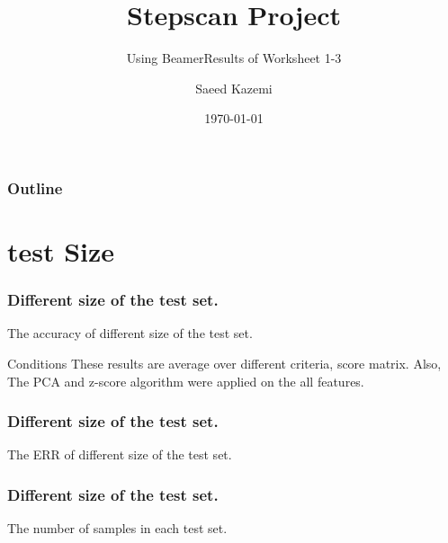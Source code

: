 \documentclass{beamer}
\subtitle{Using Beamer}
\title{ \textbf{Stepscan Project}}
\subtitle{Results of Worksheet 1-3}
\date{\today}
\author{Saeed Kazemi}
\institute{ University of New Brunswick}
\begin{document}
\begin{frame}
\titlepage
\end{frame}


\begin{frame}
\frametitle{Outline}
\tableofcontents
\end{frame}


\section{test Size}

\begin{frame}
\frametitle{Different size of the test set.}
\tiny
\begin{table}
\centering
\captionsetup{labelformat=empty}
\caption{\small The accuracy of different size of the test set.}
\label{tab:parameters condition}

\end{table}
\begin{block}{Conditions}
    These results are average over different criteria, score matrix. Also, The PCA and z-score algorithm were applied on the all features.
\end{block}

\end{frame}
\begin{frame}
\frametitle{Different size of the test set.}
\tiny
\begin{table}
\centering
\captionsetup{labelformat=empty}
\caption{\small The  ERR of different size of the test set.}
\label{tab:parameters condition}

\end{table}
\end{frame}
\begin{frame}
\frametitle{Different size of the test set.}
\tiny
\begin{table}
\centering
\captionsetup{labelformat=empty}
\caption{\small The number of samples in each test set.}
\label{tab:parameters condition}

\end{table}
\end{frame}
\end{document}

